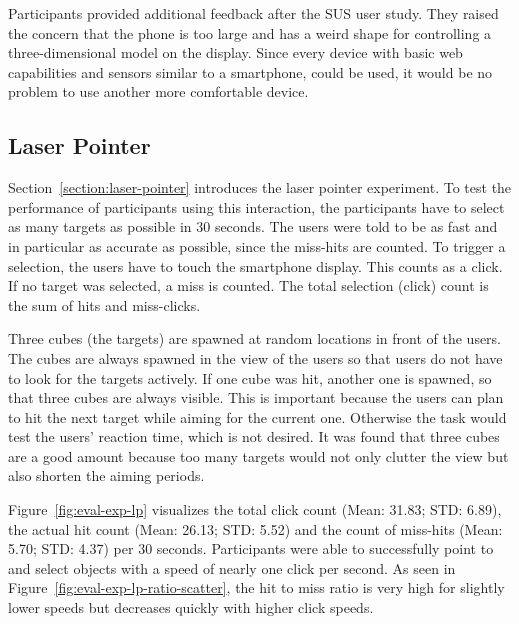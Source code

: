 Participants provided additional feedback after the \gls{SUS} user study. They raised the concern that the phone is too large and has a weird shape for controlling a three-dimensional model on the display. Since every device with basic web capabilities and sensors similar to a smartphone, could be used, it would be no problem to use another more comfortable device. 


\subsection{Laser Pointer}\label{section:eval-res-lp}

Section~\ref{section:laser-pointer} introduces the laser pointer experiment. To test the performance of participants using this interaction, the participants have to select as many targets as possible in 30 seconds. The users were told to be as fast and in particular as accurate as possible, since the miss-hits are counted. To trigger a selection, the users have to touch the smartphone display. This counts as a click. If no target was selected, a miss is counted. The total selection (click) count is the sum of hits and miss-clicks.

Three cubes (the targets) are spawned at random locations in front of the users. The cubes are always spawned in the view of the users so that users do not have to look for the targets actively. 
If one cube was hit, another one is spawned, so that three cubes are always visible. This is important because the users can plan to hit the next target while aiming for the current one. Otherwise the task would test the users' reaction time, which is not desired. It was found that three cubes are a good amount because too many targets would not only clutter the view but also shorten the aiming periods.

Figure~\ref{fig:eval-exp-lp} visualizes the total click count (Mean: 31.83; \gls{STD}: 6.89), the actual hit count (Mean: 26.13; \gls{STD}: 5.52) and the count of miss-hits (Mean: 5.70; \gls{STD}: 4.37) per 30 seconds. Participants were able to successfully point to and select objects with a speed of nearly one click per second. As seen in Figure~\ref{fig:eval-exp-lp-ratio-scatter}, the hit to miss ratio is very high for slightly lower speeds but decreases quickly with higher click speeds.

